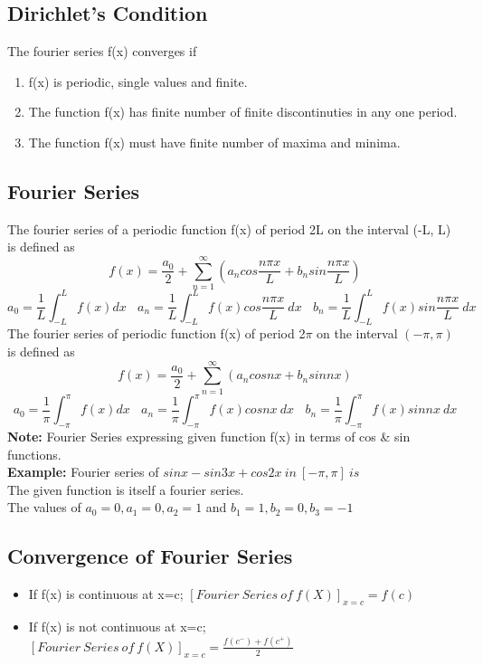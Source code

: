 \subsection*{Dirichlet's Condition}
The fourier series f(x) converges if
\begin{enumerate}
    \item f(x) is periodic, single values and finite.
    \item The function f(x) has finite number of finite discontinuties in any one period.
    \item The function f(x) must have finite number of maxima and minima.
\end{enumerate}

\subsection*{Fourier Series}
The fourier series of a periodic function f(x) of period 2L on the interval (-L, L) is defined as
\[f(x)=\frac{a_0}{2}+\sum_{n=1}^{\infty}\left(a_n cos\frac{n\pi x}{L}+b_nsin \frac{n\pi x}{L}\right)\]
\[a_0=\frac{1}{L}\int_{-L}^Lf(x)dx\ \ \ \ a_n=\frac{1}{L}\int_{-L}^Lf(x)cos\frac{n\pi x}{L}\ dx\ \ \ \ b_n = \frac{1}{L}\int_{-L}^Lf(x)sin\frac{n\pi x}{L}\ dx\]
The fourier series of periodic function f(x) of period 2\(\pi\) on the interval \((-\pi, \pi)\) is defined as
\[f(x)=\frac{a_0}{2}+\sum_{n=1}^{\infty}\left(a_n cosnx+b_nsinnx\right)\]
\[a_0=\frac{1}{\pi}\int_{-\pi}^{\pi}f(x)dx\ \ \ \ a_n=\frac{1}{\pi}\int_{-\pi}^{\pi}f(x)cosnx\ dx\ \ \ \ b_n = \frac{1}{\pi}\int_{-\pi}^{\pi}f(x)sinnx\ dx\]
\textbf{Note: }Fourier Series expressing given function f(x) in terms of cos \& sin functions.\vspace{0.2cm}\\
\textbf{Example:} Fourier series of \(sinx-sin3x+cos2x\ in\ [-\pi, \pi]\ is\)\vspace{0.3cm}\\
The given function is itself a fourier series.\vspace{0.2cm}\\
The values of \(a_0 = 0, a_1=0, a_2=1\) and \(b_1=1, b_2=0, b_3=-1\)

\subsection*{Convergence of Fourier Series}
\begin{itemize}
    \item If f(x) is continuous at x=c; \([Fourier\ Series\ of\ f(X)]_{x=c}=f(c)\)
    \item If f(x) is not continuous at x=c; \([Fourier\ Series\ of\ f(X)]_{x=c}= \frac{f(c^-)+f(c^+)}{2}\)
\end{itemize}

